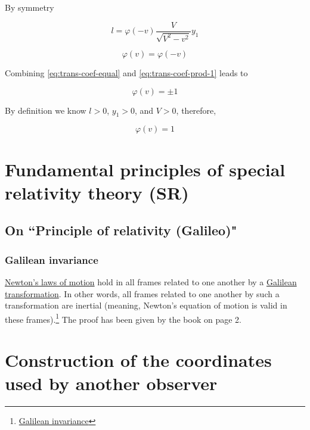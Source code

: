 By symmetry

\begin{equation}
    l = \varphi(-v)\frac{V}{\sqrt{V^2 - v^2}}y_1
\end{equation}

\begin{equation}\label{eq:trans-coef-equal}
    \varphi(v) = \varphi(-v)
\end{equation}

Combining \ref{eq:trans-coef-equal} and \ref{eq:trans-coef-prod-1} leads to

\begin{equation}
    \varphi(v) = \pm 1
\end{equation}

By definition we know $l > 0$, $y_1 > 0$, and $V > 0$, therefore,

\begin{equation}
    \varphi(v) = 1
\end{equation}

\section{Fundamental principles of special relativity theory (SR)}

\subsection{On ``Principle of relativity (Galileo)"}

\subsubsection{Galilean invariance}

\href{https://en.wikipedia.org/wiki/Newton\%27s_laws_of_motion}{Newton's laws of motion} hold in all frames related
to one another by a \href{https://en.wikipedia.org/wiki/Galilean\_transformation}{Galilean transformation}. In
other words, all frames related to one another by such a transformation are inertial (meaning, Newton's equation of
motion is valid in these frames).\footnote{\href{https://en.wikipedia.org/wiki/Galilean_invariance}{Galilean invariance}}
The proof has been given by the book on page 2.

\section{Construction of the coordinates used by another observer}

